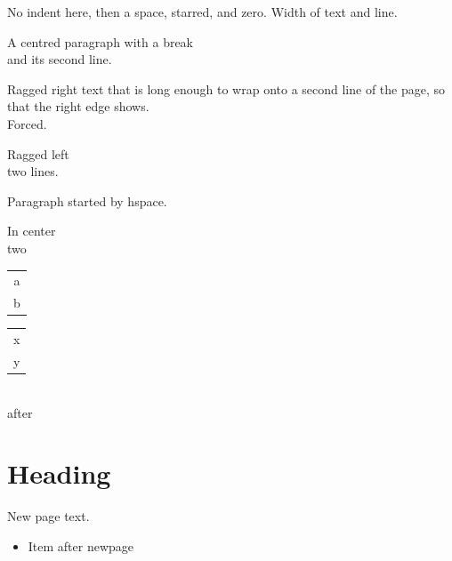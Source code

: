 \documentclass{article}
\begin{document}
\noindent No indent here, then \hspace{1em}a space, \hspace*{2pt plus 1fil}starred,
and \hspace{0pt}zero. Width \hspace{.1\textwidth}of text and \hspace{0.05\linewidth}line.

{\centering A centred paragraph with a break\\ and its second line.\par}
{\raggedright Ragged right text that is long enough to wrap onto a second line of the
page, so that the right edge shows.\\ Forced.\par}
{\raggedleft Ragged left\\ two lines.\par}

\hspace{3pt}Paragraph started by hspace.
\begin{center}
In center \\ two \begin{tabular}{c} a \\ b \end{tabular}
\end{center}
{\centering \begin{tabular}{l} x\\ y\end{tabular}\\ after\par}
\noindent\vspace{.02\textheight}
\section{Heading}
\newpage
New page text.
\begin{itemize}\item \newpage Item after newpage\end{itemize}
\end{document}
